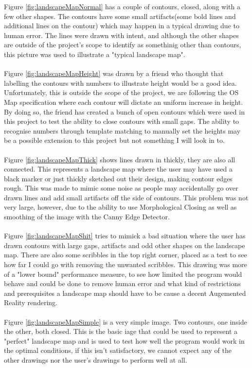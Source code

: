 \documentclass[11pt]{article}
\begin{document}
Figure \ref{fig:landscapeMapNormal} has a couple of contours, closed, along with
a few other shapes. The contours have some small artifacts(some bold lines and
additional lines on the contour) which may happen in a typical drawing due to 
human error. The lines were drawn with intent, and although the other shapes are 
outside of the project's scope to identify as somethinig other than contours,
this picture was used to illustrate a "typical landscape map". \\
\\
Figure \ref{fig:landscapeMapHeight} was drawn by a friend who thought that 
labelling the contours with numbers to illustrate height would be a good idea.
Unfortunately, this is outside the scope of the project, we are following
the OS Map specification where each contour will dictate an uniform increase in
height. By doing so, the friend has created a bunch of open contours which were
used in this project to test the ability to close contours with small gaps. 
The ability to recognise numbers through template matching to manually set the 
heights may be a possible extension to this project but not something I will look
in to. \\
\\
Figure \ref{fig:landscapeMapThick} shows lines drawn in thickly, they are also
all connected. This represents a landscape map where the user may have used
a black marker or just thickly sketched out their design, making contour edges 
rough. This was made to mimic some noise as people may accidentally go over 
drawn lines and add small artifacts off the side of contours. This problem was
not very large, however, due to the ability to use Morphological Closing as well
as smoothing of the image with the Canny Edge Detector.\\
\\
Figure \ref{fig:landscapeMapShit} tries to mimick a bad situation where
the user has drawn contours with large gaps, artifacts and odd other shapes
on the landscape map. There are also some scribbles in the top right corner, 
placed as a test to see how far I could go with removing the unwanted 
scribbles. This drawing was more of a "lower bound" performance measure, to see
how limited the program would behave and could be done to remove human error
and what kind of restrictions and prerequisites a landscape map should have
to be cause a decent Augemented Reality rendering.\\
\\
Figure \ref{fig:landscapeMapSimple} is a very simple image. Two contours, one 
inside the other, both closed. This is the basic iage that could be used to
represent a "perfect" landscape map and is used to test how well the program
would work in the optimal conditions, if this isn't satisfactory, we cannot
expect any of the other drawings nor the user's drawings to perform well at all.
\\
\end{document}
